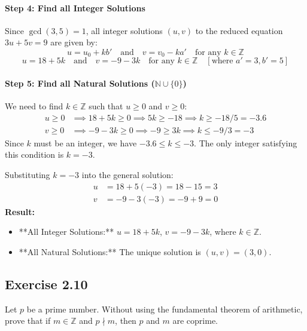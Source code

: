 \begin{solution}
\paragraph{Step 4: Find all Integer Solutions}
Since $\gcd(3, 5)=1$, all integer solutions $(u, v)$ to the reduced equation $3u+5v=9$ are given by:
$$ u = u_0 + k b' \quad \text{and} \quad v = v_0 - k a' \quad \text{for any } k \in \mathbb{Z}$$
$$ u = 18 + 5k \quad \text{and} \quad v = -9 - 3k \quad \text{for any } k \in \mathbb{Z} \quad [\text{where } a'=3, b'=5] $$

\paragraph{Step 5: Find all Natural Solutions ($\mathbb{N} \cup \{0\}$)}
We need to find $k \in \mathbb{Z}$ such that $u \ge 0$ and $v \ge 0$:
\begin{align*}
    u \ge 0 &\implies 18 + 5k \ge 0 \implies 5k \ge -18 \implies k \ge -18/5 = -3.6 \\
    v \ge 0 &\implies -9 - 3k \ge 0 \implies -9 \ge 3k \implies k \le -9/3 = -3
\end{align*}
Since $k$ must be an integer, we have $-3.6 \le k \le -3$. The only integer satisfying this condition is $k=-3$.

Substituting $k=-3$ into the general solution:
\begin{align*}
    u &= 18 + 5(-3) = 18 - 15 = 3 \\
    v &= -9 - 3(-3) = -9 + 9 = 0
\end{align*}
\textbf{Result:}
\begin{itemize}
    \item **All Integer Solutions:** $u = 18 + 5k$, $v = -9 - 3k$, where $k \in \mathbb{Z}$.
    \item **All Natural Solutions:** The unique solution is $(u, v) = (3, 0)$.
\end{itemize}
\end{solution}
\newpage
\subsection*{Exercise 2.10}
Let $p$ be a prime number. Without using the fundamental theorem of arithmetic, prove that if $m \in \mathbb{Z}$ and $p \nmid m$, then $p$ and $m$ are coprime.

